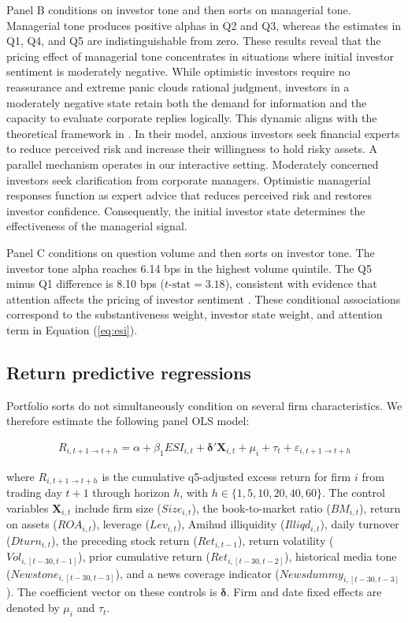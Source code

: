 \documentclass[12pt]{article}
\begin{document}
Panel B conditions on investor tone and then sorts on managerial tone. Managerial tone produces positive alphas in Q2 and Q3, whereas the estimates in Q1, Q4, and Q5 are indistinguishable from zero. These results reveal that the pricing effect of managerial tone concentrates in situations where initial investor sentiment is moderately negative. While optimistic investors require no reassurance and extreme panic clouds rational judgment, investors in a moderately negative state retain both the demand for information and the capacity to evaluate corporate replies logically. This dynamic aligns with the theoretical framework in \citet{gennaioli2015}. In their model, anxious investors seek financial experts to reduce perceived risk and increase their willingness to hold risky assets. A parallel mechanism operates in our interactive setting. Moderately concerned investors seek clarification from corporate managers. Optimistic managerial responses function as expert advice that reduces perceived risk and restores investor confidence. Consequently, the initial investor state determines the effectiveness of the managerial signal.

Panel C conditions on question volume and then sorts on investor tone. The investor tone alpha reaches 6.14 bps in the highest volume quintile. The Q5 minus Q1 difference is 8.10 bps ($t\text{-stat} = 3.18$), consistent with evidence that attention affects the pricing of investor sentiment \citep{barber2022attention,da2011}. These conditional associations correspond to the substantiveness weight, investor state weight, and attention term in Equation (\ref{eq:esi}).

\subsection{Return predictive regressions}

Portfolio sorts do not simultaneously condition on several firm characteristics. We therefore estimate the following panel OLS model:

\begin{equation}
\label{eq:rpr}
\begin{aligned}
 R_{i, t+1 \to t+h} = \alpha + \beta_1 ESI_{i,t} + \boldsymbol{\delta}'\mathbf{X}_{i,t} + \mu_i + \tau_t + \varepsilon_{i, t+1 \to t+h}
\end{aligned}
\end{equation}

\noindent where $R_{i,t+1 \to t+h}$ is the cumulative q5-adjusted excess return for firm $i$ from trading day $t+1$ through horizon $h$, with $h \in \{1, 5, 10, 20, 40, 60\}$. The control variables $\mathbf{X}_{i,t}$ include firm size ($Size_{i,t}$), the book-to-market ratio ($BM_{i,t}$), return on assets ($ROA_{i,t}$), leverage ($Lev_{i,t}$), Amihud illiquidity ($Illiqd_{i,t}$), daily turnover ($Dturn_{i,t}$), the preceding stock return ($Ret_{i,t-1}$), return volatility ($Vol_{i,[t-30,t-1]}$), prior cumulative return ($Ret_{i,[t-30,t-2]}$), historical media tone ($Newstone_{i,[t-30,t-3]}$), and a news coverage indicator ($Newsdummy_{i,[t-30,t-3]}$). The coefficient vector on these controls is $\boldsymbol{\delta}$. Firm and date fixed effects are denoted by $\mu_i$ and $\tau_t$.
\end{document}
